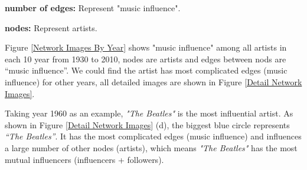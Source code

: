 \documentclass[12pt]{article}
\begin{document}
\textbf{number of edges:} Represent "music influence".

\textbf{nodes:} Represent artists.

Figure \ref{Network Images By Year} shows "music influence" among all artists in each 10 year from 1930 to 2010, nodes are artists and edges between nods are “music influence”. We could find the artist has most complicated edges (music influence) for other years, all detailed images are shown in Figure \ref{Detail Network Images}. 


Taking year 1960 as an example, \emph{"The Beatles"} is the most influential artist. As shown in Figure \ref{Detail Network Images} (d), the biggest blue circle represents \emph{“The Beatles”}. It has the most complicated edges (music influence) and influences a large number of other nodes (artists), which means \emph{"The Beatles"} has the most mutual influencers (influencers + followers).
\end{document}
